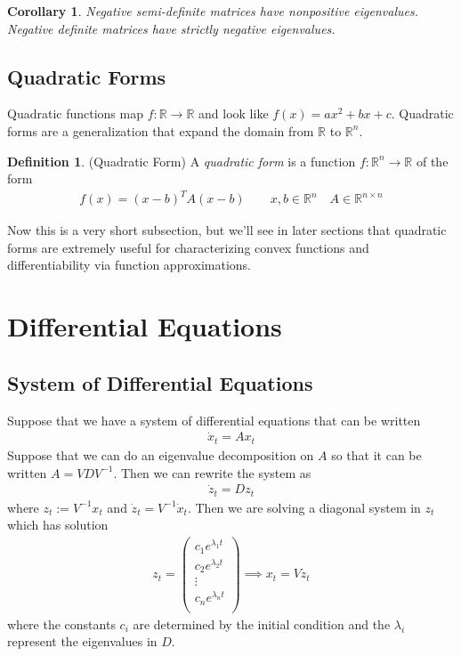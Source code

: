 \documentclass[12pt]{article}
\numberwithin{equation}{section} %
\theoremstyle{plain}
\newtheorem{cor}[thm]{Corollary}
\theoremstyle{definition}
\newtheorem{defn}[thm]{Definition}
\theoremstyle{remark}
\newcommand{\dx}{\dot{x}}
\newcommand{\dz}{\dot{z}}
\newcommand{\R}{\mathbb{R}}
\newcommand{\Rn}{\mathbb{R}^n}
\newcommand{\Rnn}{\mathbb{R}^{n\times n}}
\begin{document}
\begin{cor}
Negative semi-definite matrices have nonpositive eigenvalues. Negative
definite matrices have strictly negative eigenvalues.
\end{cor}

\subsection{Quadratic Forms}

Quadratic functions map $f:\R\rightarrow\R$ and look like $f(x)=ax^2 +
bx+c$. Quadratic forms are a generalization that expand the domain from
$\R$ to $\Rn$.

\begin{defn}{(Quadratic Form)}
A \emph{quadratic form} is a function $f:\Rn\rightarrow\R$ of the form
\begin{align*}
  f(x) = (x-b)^TA(x-b)
  \qquad x,b\in\Rn \quad A\in\Rnn
\end{align*}
\end{defn}

Now this is a very short subsection, but we'll see in later sections
that quadratic forms are extremely useful for characterizing convex
functions and differentiability via function approximations.

\clearpage
\section{Differential Equations}

\subsection{System of Differential Equations}

Suppose that we have a system of differential equations that can be
written
\begin{align*}
  \dx_t = Ax_t
\end{align*}
Suppose that we can do an eigenvalue decomposition on $A$ so that it can
be written $A = VD V^{-1}$. Then we can rewrite the system as
\begin{align*}
  \dz_t = Dz_t
\end{align*}
where $z_t:= V^{-1}x_t$ and $\dz_t=V^{-1}\dx_t$. Then we are solving a
diagonal system in $z_t$ which has solution
\begin{align*}
  z_t =
  \begin{pmatrix}
    c_1 e^{\lambda_1 t} \\
    c_2 e^{\lambda_2 t} \\
    \vdots \\
    c_n e^{\lambda_n t} \\
  \end{pmatrix}
  \implies
  x_t = V z_t
\end{align*}
where the constants $c_i$ are determined by the initial condition and
the $\lambda_i$ represent the eigenvalues in $D$.
\end{document}
